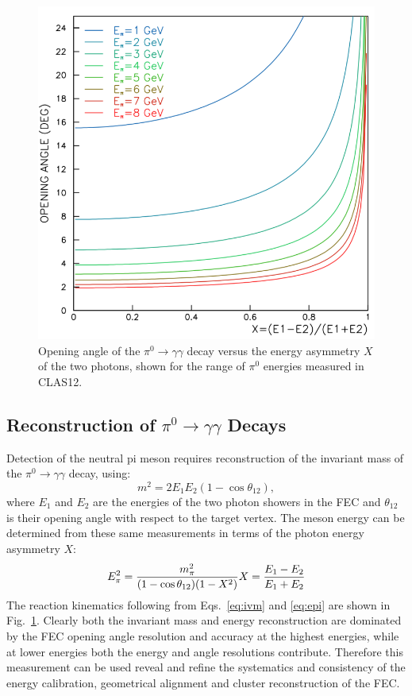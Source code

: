 \begin{figure}[t]
\centering
\includegraphics[width=0.7\columnwidth,keepaspectratio]{img/opa.png}
\caption[]{Opening angle of the $\pi^0 \rightarrow \gamma \gamma$ decay versus the energy asymmetry $X$ of the two photons, shown for the range of $\pi^0$ energies measured in CLAS12. }
\label{fig:opa}
\end{figure}

\subsection{Reconstruction of $\pi^0\rightarrow \gamma \gamma$ Decays}

Detection of the neutral pi meson requires reconstruction of the invariant mass of the $\pi^0 \rightarrow \gamma \gamma$ decay, using:
\begin{equation}
m^2 = 2 E_1 E_2 (1-\cos \theta_{12}),
\label{eq:ivm}
\end{equation}
 where $E_1$ and $E_2$ are the energies of the two photon showers in the FEC and $\theta_{12}$ is their opening angle with respect to the target vertex.  The meson energy can be determined from these same measurements in terms of the photon energy asymmetry $X$:
\begin{equation}
E^2_{\pi} = \frac{m^2_{\pi}}{(1-\cos \theta_{12})(1-X^2)}  \\
X=\frac{E_1-E_2}{E_1+E_2}
\label{eq:epi}
\end{equation}
The reaction kinematics following from Eqs.~\ref{eq:ivm} and \ref{eq:epi} are shown in Fig.~\ref{fig:opa}.  Clearly both the invariant mass and energy reconstruction are dominated by the FEC opening angle resolution and accuracy at the highest energies, while at lower energies both the energy and angle resolutions contribute.   Therefore this measurement can be used reveal and refine the systematics and consistency of the energy calibration, geometrical alignment and cluster reconstruction of the FEC.

